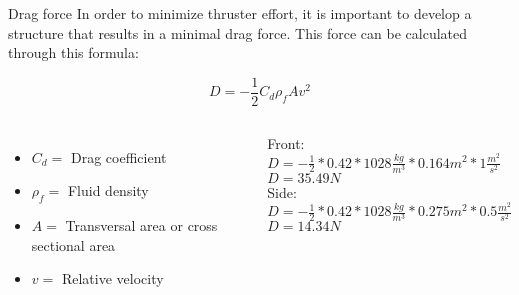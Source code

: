 \begin{frame}[c]{Drag force}
  In order to minimize thruster effort, it is important to develop a structure that results in a minimal drag force. This force can be calculated through this formula:   
  
  \begin{equation}
    D = -\frac{1}{2}C_{d} \rho_{f} A v^2
  \end{equation}
  \begin{columns}
      \begin{itemize}
        \item $C_{d} =$ Drag coefficient
        \item $\rho_{f} =$ Fluid density
        \item $A =$ Transversal area or cross sectional area
        \item $v =$ Relative velocity   
      \end{itemize}
    Front: \\
      $D = -\frac{1}{2} * 0.42 * 1028 \frac{kg}{m^3} * 0.164 m^2 * 1 \frac{m^2}{s^2}$ \\
      $D = 35.49 N$ \\
    Side: \\
      $D = -\frac{1}{2} * 0.42 * 1028 \frac{kg}{m^3} * 0.275 m^2 * 0.5 \frac{m^2}{s^2}$ \\
      $D =  14.34 N$
  \end{columns}
  

\end{frame}

